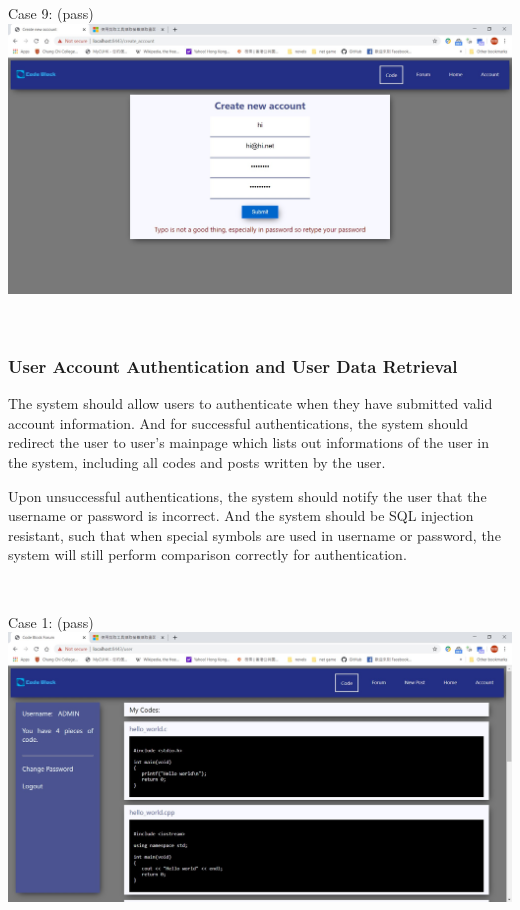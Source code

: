 Case 9: (pass)\\
\includegraphics[scale=0.45]{Doc/Pics/case-5-1-9}

~

\subsubsection{User Account Authentication and User Data Retrieval}
The system should allow users to authenticate when they have submitted valid account information. And for successful authentications, the system should redirect the user to user's mainpage which lists out informations of the user in the system, including all codes and posts written by the user.

Upon unsuccessful authentications, the system should notify the user that the username or password is incorrect. And the system should be SQL injection resistant, such that when special symbols are used in username or password, the system will still perform comparison correctly for authentication.

~

Case 1: (pass)\\
\includegraphics[scale=0.45]{Doc/Pics/case-5-2-1}

